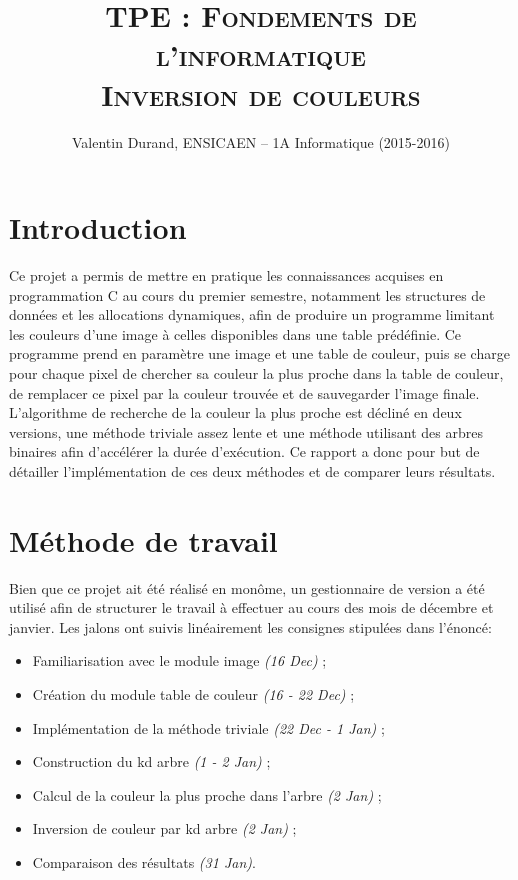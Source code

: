 \documentclass[a4paper,11pt,final]{article}
\title{TPE : \textsc{Fondements de l'informatique \\ Inversion de couleurs}}
\author{Valentin Durand, ENSICAEN -- 1A Informatique (2015-2016)}
\begin{document}
\maketitle

\tableofcontents
\sloppy 
\cleardoublepage

\section*{Introduction}

Ce projet a permis de mettre en pratique les connaissances acquises en programmation C au cours du premier semestre, notamment les structures de données et les allocations dynamiques, afin de produire un programme limitant les couleurs d'une image à celles disponibles dans une table prédéfinie. Ce programme prend en paramètre une image et une table de couleur, puis se charge pour chaque pixel de chercher sa couleur la plus proche dans la table de couleur, de remplacer ce pixel par la couleur trouvée et de sauvegarder l’image finale. L’algorithme de recherche de la couleur la plus proche est décliné en deux versions, une méthode triviale assez lente et une méthode utilisant des arbres binaires afin d’accélérer la durée d’exécution. Ce rapport a donc pour but de détailler l’implémentation de ces deux méthodes et de comparer leurs résultats.

\section{Méthode de travail}

Bien que ce projet ait été réalisé en monôme, un gestionnaire de version a été utilisé afin de structurer le travail à effectuer au cours des mois de décembre et janvier. Les jalons ont suivis linéairement les consignes stipulées dans l’énoncé:
\begin{itemize}
\item Familiarisation avec le module image \emph{(16 Dec)} ;
\item Création du module table de couleur \emph{(16 - 22 Dec)} ;
\item Implémentation de la méthode triviale \emph{(22 Dec - 1 Jan)} ;
\item Construction du kd arbre \emph{(1 - 2 Jan)} ;
\item Calcul de la couleur la plus proche dans l’arbre \emph{(2 Jan)} ;
\item Inversion de couleur par kd arbre \emph{(2 Jan)} ;
\item Comparaison des résultats \emph{(31 Jan)}.
\end{itemize}
\end{document}
